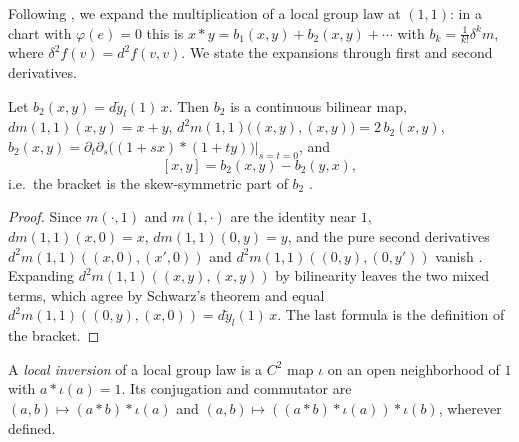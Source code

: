 Following \cite[Remark 5.1.8]{GN26}, we expand the multiplication of a local group law at
$(1, 1)$: in a chart with $\varphi(e) = 0$ this is
$x * y = b_1(x, y) + b_2(x, y) + \cdots$ with $b_k = \frac{1}{k!}\delta^k m$, where
$\delta^2 f(v) = d^2 f(v, v)$. We state the expansions through first and second derivatives.

\begin{lemma}
  \label{lem:taylor-mul}
  \leanok
  Let $b_2(x, y) = d\tilde y_l(1)\,x$. Then $b_2$ is a continuous bilinear map,
  $dm(1, 1)(x, y) = x + y$, $d^2 m(1, 1)\bigl((x, y), (x, y)\bigr) = 2\,b_2(x, y)$,
  $b_2(x, y) = \partial_t \partial_s \bigl((1 + s x) * (1 + t y)\bigr)\big|_{s = t = 0}$, and
  \[
    [x, y] = b_2(x, y) - b_2(y, x) ,
  \]
  i.e.\ the bracket is the skew-symmetric part of $b_2$ \cite[Remark 5.1.8(a)]{GN26}.
\end{lemma}

\begin{proof}
  \leanok
  Since $m(\cdot, 1)$ and $m(1, \cdot)$ are the identity near $1$, $dm(1, 1)(x, 0) = x$,
  $dm(1, 1)(0, y) = y$, and the pure second derivatives
  $d^2 m(1, 1)((x, 0), (x', 0))$ and $d^2 m(1, 1)((0, y), (0, y'))$ vanish
  \cite[Lemma 5.1.7]{GN26}. Expanding $d^2 m(1, 1)((x, y), (x, y))$ by bilinearity leaves the
  two mixed terms, which agree by Schwarz's theorem and equal
  $d^2 m(1, 1)((0, y), (x, 0)) = d\tilde y_l(1)\,x$. The last formula is the definition of the
  bracket.
\end{proof}

\begin{definition}
  \label{def:local-inverse}
  \leanok
  A \emph{local inversion} of a local group law is a $C^2$ map $\iota$ on an open neighborhood
  of $1$ with $a * \iota(a) = 1$. Its conjugation and commutator are
  $(a, b) \mapsto (a * b) * \iota(a)$ and $(a, b) \mapsto ((a * b) * \iota(a)) * \iota(b)$,
  wherever defined.
\end{definition}

